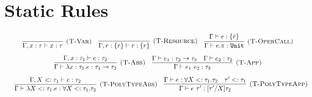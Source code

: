 \documentclass{llncs}
\newcommand{\keywadj}[1]{\mathtt{#1}}
\newcommand{\keyw}[1]{\keywadj{#1}~}
\newcommand{\kw}[1]{\keyw{ #1 }}
\newcommand{\kwa}[1]{\keywadj{ #1 }}
\begin{document}
\section{Static Rules}


\[
\begin{array}{c}


\infer[\textsc{(T-Var)}]
	{\Gamma, x: \tau \vdash x: \tau}
	{}
~~~
\infer[\textsc{(T-Resource)}]
	{\Gamma, r: \{ r \} \vdash r : \{ r \}}
	{}

~~~

\infer[\textsc{(T-OperCall)}]
	{\Gamma \vdash e.\pi: \kwa{Unit}}
	{\Gamma \vdash e: \{ \bar r \}} \\[2ex]
\infer[\textsc{(T-Abs)}]
	{\Gamma \vdash \lambda x: \tau_1.e : \tau_1 \rightarrow \tau_2}
	{\Gamma, x: \tau_1 \vdash e: \tau_2}
~~~

\infer[\textsc{(T-App)}]
	{\Gamma \vdash e_1~e_2: \tau_3}
	{\Gamma \vdash e_1: \tau_2 \rightarrow \tau_3 & \Gamma \vdash e_2: \tau_2}\\[2ex]
~~~
\infer[\textsc{(T-PolyTypeAbs)}]
	{\Gamma \vdash \lambda X <: \tau_1. e : \forall X <: \tau_1. \tau_2}
	{\Gamma, X <: \tau_1 \vdash e: \tau_2 }
~~~
\infer[\textsc{(T-PolyTypeApp)}]
	{\Gamma \vdash e~\tau' : [\tau'/X]\tau_2}
	{\Gamma \vdash e: \forall X <: \tau_1.\tau_2  & \tau' <: \tau_1  }

\end{array}
\]


















\noindent
\fbox{$\hat \Gamma \vdash \hat e: \hat \tau~\kw{with} \varepsilon$}
\end{document}

